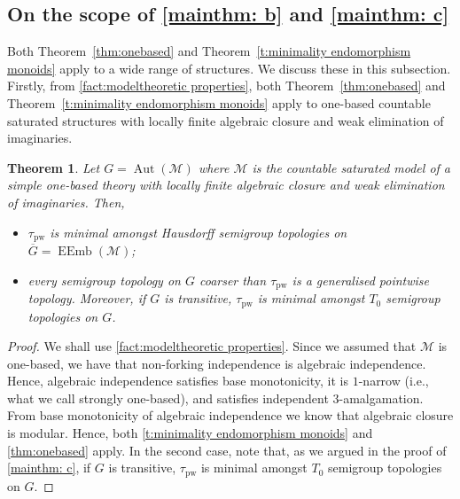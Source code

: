 \documentclass{article}
\newtheorem{theorem}{Theorem}[section]
\theoremstyle{remark}
\theoremstyle{definition}
\DeclareMathOperator{\Aut}{Aut}
\DeclareMathOperator{\EEmb}{EEmb}
\newcommand{\M}[0]{\mathcal{M}}
\newcommand{\pw}[0]{\tau_{\mathrm{pw}}}
\begin{document}
{{{{{\subsection{On the scope of \cref{mainthm: b} and \cref{mainthm: c}}\label{sub:mainapplications}






Both Theorem~\ref{thm:onebased} and Theorem~\ref{t:minimality endomorphism monoids} apply to a wide range of structures. We discuss these in this subsection.\\

Firstly, from \cref{fact:modeltheoretic properties}, both Theorem~\ref{thm:onebased} and Theorem~\ref{t:minimality endomorphism monoids} apply to one-based countable saturated structures with locally finite algebraic closure and weak elimination of imaginaries.


\begin{theorem}\label{thm: simple theorem} Let $G=\Aut(\M)$ where $\M$ is the countable saturated model of a simple one-based theory with {locally finite algebraic closure and} weak elimination of imaginaries. Then, 
\begin{itemize}
    \item $\pw$ is minimal amongst Hausdorff semigroup topologies on $\overline{G}=\EEmb(\M)$;
    \item every semigroup topology on $G$ coarser than $\pw$ is a generalised pointwise topology. Moreover, if $G$ is transitive, $\pw$ is minimal amongst {$T_0$} semigroup topologies on $G$. 
\end{itemize}
\end{theorem}
\begin{proof}%
We shall use \cref{fact:modeltheoretic properties}. Since we assumed that $\M$ is one-based, we have that non-forking independence is algebraic independence. Hence, algebraic independence satisfies base monotonicity, it is $1$-narrow (i.e., what we call strongly one-based), and satisfies independent $3$-amalgamation. From base monotonicity of algebraic independence we know that algebraic closure is modular. Hence, both \cref{t:minimality endomorphism monoids} and \cref{thm:onebased} apply. In the second case, note that,
as we argued in the proof of \cref{mainthm: c}, if $G$ is transitive, $\pw$ is minimal amongst {$T_0$} semigroup topologies on $G$.
\end{proof}



}}}}}
\end{document}
